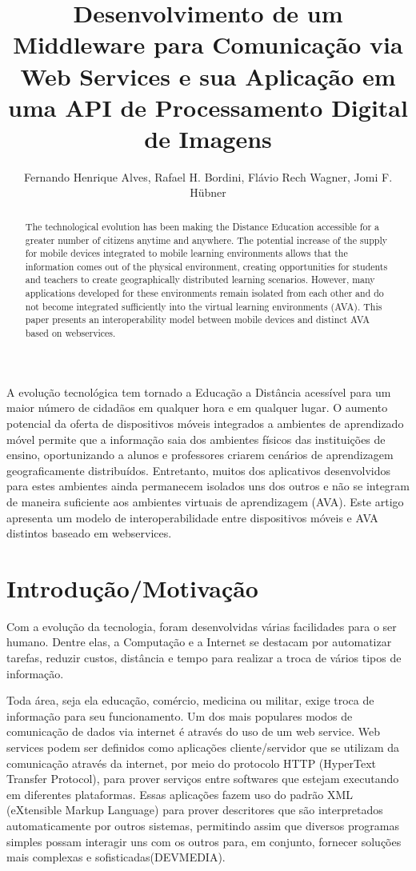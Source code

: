\documentclass[12pt]{article}
\title{Desenvolvimento de um Middleware para Comunicação via Web Services e sua Aplicação  em uma API de Processamento Digital de Imagens}
\author{Fernando Henrique Alves\inst{1}, Rafael H. Bordini\inst{2}, Flávio Rech
  Wagner\inst{1}, Jomi F. Hübner\inst{3} }
\begin{document}
 

\maketitle

\begin{abstract}
  The technological evolution has been making the Distance
  Education accessible for a greater number of citizens anytime and anywhere.
  The potential increase of the supply for mobile devices integrated to mobile
  learning environments allows that the information comes out of the physical
  environment, creating opportunities for students and teachers to create
  geographically distributed learning scenarios. However, many applications
  developed for these environments remain isolated from each other and do not
  become integrated sufficiently into the virtual learning environments (AVA).
  This paper presents an interoperability model between mobile devices and
  distinct AVA based on webservices.
\end{abstract}

\begin{resumo} 
  A evolução tecnológica tem tornado a Educação a Distância
  acessível para um maior número de cidadãos em qualquer hora e em qualquer
  lugar. O aumento potencial da oferta de dispositivos móveis integrados a
  ambientes de aprendizado móvel permite que a informação saia dos ambientes
  físicos das instituições de ensino, oportunizando a alunos e professores
  criarem cenários de aprendizagem geograficamente distribuídos. Entretanto,
  muitos dos aplicativos desenvolvidos para estes ambientes ainda permanecem
  isolados uns dos outros e não se integram de maneira suficiente aos ambientes
  virtuais de aprendizagem (AVA). Este artigo apresenta um modelo de
  interoperabilidade entre dispositivos móveis e AVA distintos baseado em
  webservices.
\end{resumo}


\section{Introdução/Motivação}

Com a evolução da tecnologia, foram desenvolvidas várias facilidades para o ser humano. 
Dentre elas, a Computação e a Internet se destacam por automatizar tarefas, reduzir
custos, distância e tempo para realizar a troca de vários tipos de informação. 

Toda área, seja ela educação, comércio, medicina ou militar, exige troca de informação para seu funcionamento. 
Um dos mais populares modos de comunicação de dados via internet é através do uso de um web service. 
Web services podem ser definidos como aplicações cliente/servidor que se utilizam da comunicação 
através da internet, por meio do protocolo HTTP (HyperText Transfer Protocol), para prover serviços 
entre softwares que estejam executando em diferentes plataformas. Essas aplicações fazem uso do padrão 
XML (eXtensible Markup Language) para prover descritores que são interpretados automaticamente 
por outros sistemas, permitindo assim que diversos programas simples possam interagir uns com os 
outros para, em conjunto, fornecer soluções mais complexas e sofisticadas(DEVMEDIA).
\end{document}

